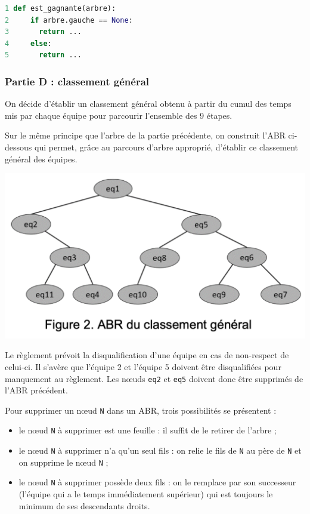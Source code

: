 \begin{lstlisting}[language=Python]
1 def est_gagnante(arbre):
2     if arbre.gauche == None:
3       return ...
4     else:
5       return ...
\end{lstlisting}

\subsubsection{Partie D : classement
général}\label{partie-d-classement-guxe9nuxe9ral}

On décide d'établir un classement général obtenu à partir du cumul des
temps mis par chaque équipe pour parcourir l'ensemble des 9 étapes.

Sur le même principe que l'arbre de la partie précédente, on construit
l'ABR ci-dessous qui permet, grâce au parcours d'arbre approprié,
d'établir ce classement général des équipes.

\includegraphics{24-NSIJ1ME1-Ex3-04.png}

Le règlement prévoit la disqualification d'une équipe en cas de
non-respect de celui-ci. Il s'avère que l'équipe 2 et l'équipe 5 doivent
être disqualifiées pour manquement au règlement. Les nœuds
\passthrough{\lstinline!eq2!} et \passthrough{\lstinline!eq5!} doivent
donc être supprimés de l'ABR précédent.

Pour supprimer un nœud \passthrough{\lstinline!N!} dans un ABR, trois
possibilités se présentent :

\begin{itemize}
\item
  le nœud \passthrough{\lstinline!N!} à supprimer est une feuille : il
  suffit de le retirer de l'arbre ;
\item
  le nœud \passthrough{\lstinline!N!} à supprimer n'a qu'un seul fils :
  on relie le fils de \passthrough{\lstinline!N!} au père de
  \passthrough{\lstinline!N!} et on supprime le nœud
  \passthrough{\lstinline!N!} ;
\item
  le nœud \passthrough{\lstinline!N!} à supprimer possède deux fils : on
  le remplace par son successeur (l'équipe qui a le temps immédiatement
  supérieur) qui est toujours le minimum de ses descendants droits.
\end{itemize}

